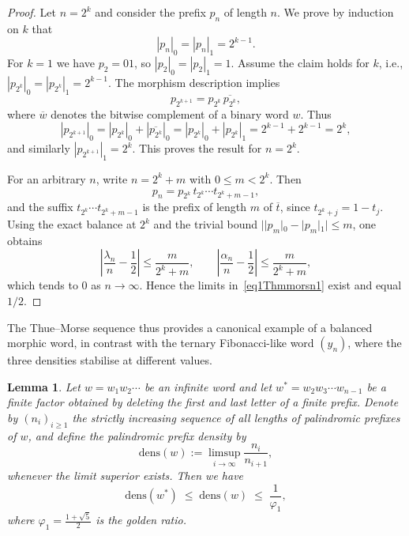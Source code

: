 \documentclass[12pt]{amsart}
\newtheorem{lemma}[theorem]{Lemma}
\begin{document}
\begin{proof}
Let $n=2^k$ and consider the prefix $p_n$ of length $n$. We prove by induction on $k$ that
\[
|p_n|_0 = |p_n|_1 = 2^{k-1}.
\]
For $k=1$ we have $p_2=01$, so $|p_2|_0 = |p_2|_1 = 1$. Assume the claim holds for $k$, i.e., $|p_{2^k}|_0 = |p_{2^k}|_1 = 2^{k-1}$. The morphism description implies
\[
p_{2^{k+1}} = p_{2^k}\,\overline{p_{2^k}},
\]
where $\overline{w}$ denotes the bitwise complement of a binary word $w$. Thus
\[
|p_{2^{k+1}}|_0 = |p_{2^k}|_0 + |\overline{p_{2^k}}|_0 = |p_{2^k}|_0 + |p_{2^k}|_1 = 2^{k-1} + 2^{k-1} = 2^k,
\]
and similarly $|p_{2^{k+1}}|_1 = 2^k$. This proves the result for $n=2^k$.

For an arbitrary $n$, write $n=2^k + m$ with $0\le m<2^k$. Then
\[
p_n = p_{2^k}\, t_{2^k}\cdots t_{2^k+m-1},
\]
and the suffix $t_{2^k}\cdots t_{2^k+m-1}$ is the prefix of length $m$ of $\overline{t}$, since $t_{2^k+j}=1-t_j$. Using the exact balance at $2^k$ and the trivial bound $||p_m|_0-|p_m|_1|\le m$, one obtains
\[
\left|\frac{\lambda_n}{n} - \frac{1}{2}\right| \le \frac{m}{2^k+m},\qquad
\left|\frac{\alpha_n}{n} - \frac{1}{2}\right| \le \frac{m}{2^k+m},
\]
which tends to $0$ as $n\to\infty$. Hence the limits in~\eqref{eq1Thmmorsn1} exist and equal $1/2$.
\end{proof}

The Thue--Morse sequence thus provides a canonical example of a balanced morphic word, in contrast with the ternary Fibonacci-like word $(y_n)$, where the three densities stabilise at different values.

\begin{lemma}\label{lemmanovelwordn2}
Let $w = w_1 w_2 \cdots$ be an infinite word and let $w^* = w_2 w_3 \cdots w_{n-1}$ be a finite factor obtained by deleting the first and last letter of a finite prefix. Denote by $(n_i)_{i\ge 1}$ the strictly increasing sequence of all lengths of palindromic prefixes of $w$, and define the palindromic prefix density by
\[
\mathrm{dens}(w) := \limsup_{i\to\infty} \frac{n_i}{n_{i+1}},
\]
whenever the limit superior exists.
Then we have
\begin{equation}\label{eq1lemmanovelwordn2}
\mathrm{dens}(w^*) \;\leqslant\; \mathrm{dens}(w) \;\leqslant\; \frac{1}{\varphi_1},
\end{equation}
where $\varphi_1 = \frac{1+\sqrt{5}}{2}$ is the golden ratio.
\end{lemma}
\end{document}
